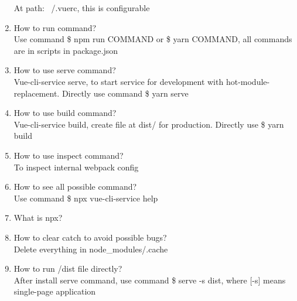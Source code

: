 \documentclass[10pt,a4paper,oneside]{article}
\begin{document}
\begin{enumerate}[1.]
At path: ~/.vuerc, this is configurable
\item  How to run command?  \\
Use command \$ npm run COMMAND or \$ yarn COMMAND, all commands are in scripts in package.json
\item   How to use serve command? \\
Vue-cli-service serve, to start service for development with hot-module-replacement. Directly use command \$ yarn serve
\item  How to use build command?  \\
Vue-cli-service build, create file at dist/ for production. Directly use \$ yarn build
\item  How to use inspect command?  \\
To inspect internal webpack config
\item   How to see all possible command? \\
Use command \$ npx vue-cli-service help
\item  What is npx?  \\

\item How to clear catch to avoid possible bugs?   \\
Delete everything in node\_modules/.cache
\item   How to run /dist file directly? \\
After install serve command, use command \$ serve -s dist, where [-s] means single-page application	
\end{enumerate}
\end{document}
